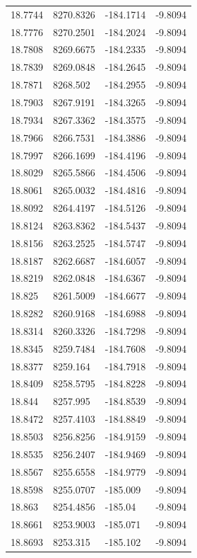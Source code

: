\begin{table}[H]
\begin{tabular}{llll}
18.7744 & 8270.8326 & -184.1714 & -9.8094 \\
18.7776 & 8270.2501 & -184.2024 & -9.8094 \\
18.7808 & 8269.6675 & -184.2335 & -9.8094 \\
18.7839 & 8269.0848 & -184.2645 & -9.8094 \\
18.7871 & 8268.502 & -184.2955 & -9.8094 \\
18.7903 & 8267.9191 & -184.3265 & -9.8094 \\
18.7934 & 8267.3362 & -184.3575 & -9.8094 \\
18.7966 & 8266.7531 & -184.3886 & -9.8094 \\
18.7997 & 8266.1699 & -184.4196 & -9.8094 \\
18.8029 & 8265.5866 & -184.4506 & -9.8094 \\
18.8061 & 8265.0032 & -184.4816 & -9.8094 \\
18.8092 & 8264.4197 & -184.5126 & -9.8094 \\
18.8124 & 8263.8362 & -184.5437 & -9.8094 \\
18.8156 & 8263.2525 & -184.5747 & -9.8094 \\
18.8187 & 8262.6687 & -184.6057 & -9.8094 \\
18.8219 & 8262.0848 & -184.6367 & -9.8094 \\
18.825 & 8261.5009 & -184.6677 & -9.8094 \\
18.8282 & 8260.9168 & -184.6988 & -9.8094 \\
18.8314 & 8260.3326 & -184.7298 & -9.8094 \\
18.8345 & 8259.7484 & -184.7608 & -9.8094 \\
18.8377 & 8259.164 & -184.7918 & -9.8094 \\
18.8409 & 8258.5795 & -184.8228 & -9.8094 \\
18.844 & 8257.995 & -184.8539 & -9.8094 \\
18.8472 & 8257.4103 & -184.8849 & -9.8094 \\
18.8503 & 8256.8256 & -184.9159 & -9.8094 \\
18.8535 & 8256.2407 & -184.9469 & -9.8094 \\
18.8567 & 8255.6558 & -184.9779 & -9.8094 \\
18.8598 & 8255.0707 & -185.009 & -9.8094 \\
18.863 & 8254.4856 & -185.04 & -9.8094 \\
18.8661 & 8253.9003 & -185.071 & -9.8094 \\
18.8693 & 8253.315 & -185.102 & -9.8094 \\

\end{tabular}
\end{table}
